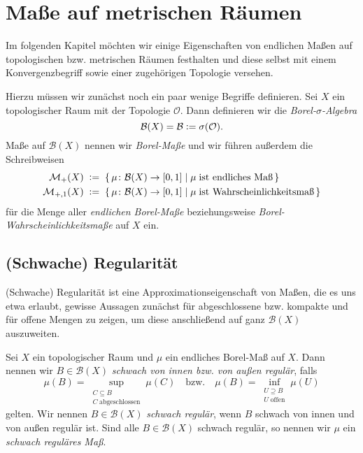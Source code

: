 \documentclass[../main/main.tex]{subfiles}
\begin{document}
	
	\section{Maße auf metrischen Räumen}
	
	Im folgenden Kapitel möchten wir einige Eigenschaften von endlichen Maßen auf topologischen bzw. metrischen Räumen
	festhalten und diese selbst mit einem Konvergenzbegriff sowie einer zugehörigen Topologie versehen.
	
	Hierzu müssen wir zunächst noch ein paar wenige Begriffe definieren.
	Sei $X$ ein topologischer Raum mit der Topologie $\mathcal{O}$. Dann definieren wir die
	\emph{Borel-$\sigma$-Algebra} 
	$$\mathcal{B}(X) = \mathcal{B} \vcentcolon = \sigma(\mathcal{O}) \text{.}$$
	Maße auf $\mathcal{B}(X)$ nennen wir \emph{Borel-Maße} und wir führen außerdem die Schreibweisen
	\begin{align*}
		\mathcal{M}_{+}(X)  \; &\vcentcolon = \; \left\{\, \mu \colon \mathcal{B}(X) \to [0,1] \; \middle| \; \mu \; 
			\text{ist endliches Maß} \,\right\} \\
		\mathcal{M}_{+,1}(X) \; &\vcentcolon = \; \left\{\, \mu \colon \mathcal{B}(X) \to [0,1] \; \middle| \; \mu \; 
			\text{ist Wahrscheinlichkeitsmaß} \,\right\}
	\end{align*}
	für die Menge aller \emph{endlichen Borel-Maße} beziehungsweise \emph{Borel-Wahrscheinlichkeitsmaße} auf $X$ ein.
	
	\subsection{(Schwache) Regularität}
	
	(Schwache) Regularität ist eine 
	Approximationseigenschaft von Maßen, die es uns etwa erlaubt, gewisse Aussagen 
	zunächst für abgeschlossene bzw. kompakte und für offene Mengen zu zeigen, um diese 
	anschließend auf ganz $\mathcal{B}(X)$ auszuweiten. 
	
	\begin{Definition}
		\label{def:regularity}
		Sei $X$ ein topologischer Raum und $\mu$ ein endliches Borel-Maß auf $X$. 
		Dann nennen wir $B \in \mathcal{B}(X)$ \emph{schwach von 
			innen bzw. von außen regulär}, falls
		$$\mu(B) = \sup_{\substack{C \subseteq B \\ C \; \text{abgeschlossen}}} \mu(C) 
		\quad \text{bzw.} \quad \mu(B) = \inf_{\substack{U \supseteq B \\ U \; \text{offen}}} 
		\mu(U)$$
		gelten. Wir nennen $B \in \mathcal{B}(X)$ \emph{schwach regulär}, wenn $B$ schwach von innen und 
		von außen regulär ist. Sind alle $B \in \mathcal{B}(X)$ schwach regulär, 
		so nennen wir $\mu$ ein \emph{schwach reguläres Maß}.
	\end{Definition}
\end{document}
